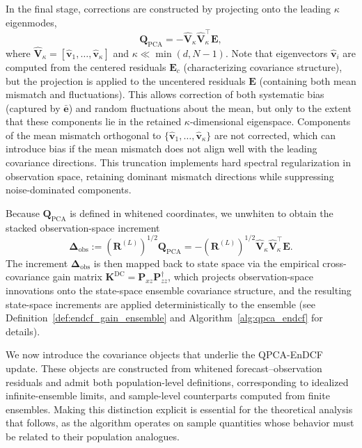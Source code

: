 \documentclass[11pt,a4paper]{article}
\begin{document}
In the final stage, corrections are constructed by projecting onto the leading $\kappa$ eigenmodes,
\begin{equation}
\mathbf{Q}_{\mathrm{PCA}}
=
-\hat{\mathbf{V}}_\kappa\hat{\mathbf{V}}_\kappa^\top\mathbf{E},
\label{eq:qpca_correction}
\end{equation}
where $\hat{\mathbf{V}}_\kappa=[\hat{\mathbf{v}}_1,\ldots,\hat{\mathbf{v}}_\kappa]$ and $\kappa\ll\min(d,N-1)$. Note that eigenvectors $\hat{\mathbf{v}}_i$ are computed from the centered residuals $\mathbf{E}_c$ (characterizing covariance structure), but the projection is applied to the uncentered residuals $\mathbf{E}$ (containing both mean mismatch and fluctuations). This allows correction of both systematic bias (captured by $\bar{\mathbf{e}}$) and random fluctuations about the mean, but only to the extent that these components lie in the retained $\kappa$-dimensional eigenspace. Components of the mean mismatch orthogonal to $\{\hat{\mathbf{v}}_1,\ldots,\hat{\mathbf{v}}_\kappa\}$ are not corrected, which can introduce bias if the mean mismatch does not align well with the leading covariance directions. This truncation implements hard spectral regularization in observation space, retaining dominant mismatch directions while suppressing noise-dominated components.

Because $\mathbf{Q}_{\mathrm{PCA}}$ is defined in whitened coordinates, we unwhiten to obtain the stacked observation-space increment
\begin{equation}
\boldsymbol{\Delta}_{\mathrm{obs}}
:=
(\mathbf{R}^{(L)})^{1/2}\mathbf{Q}_{\mathrm{PCA}}
=
-(\mathbf{R}^{(L)})^{1/2}\hat{\mathbf{V}}_\kappa\hat{\mathbf{V}}_\kappa^\top\mathbf{E}.
\label{eq:qpca_delta_obs}
\end{equation}
The increment $\boldsymbol{\Delta}_{\mathrm{obs}}$ is then mapped back to state space via the empirical cross-covariance gain matrix $\mathbf{K}^{\mathrm{DC}}=\mathbf{P}_{xz}\mathbf{P}_{zz}^{\dagger}$, which projects observation-space innovations onto the state-space ensemble covariance structure, and the resulting state-space increments are applied deterministically to the ensemble (see Definition~\ref{def:endcf_gain_ensemble} and Algorithm~\ref{alg:qpca_endcf} for details).

We now introduce the covariance objects that underlie the QPCA-EnDCF update. These objects are constructed from whitened forecast--observation residuals and admit both population-level definitions, corresponding to idealized infinite-ensemble limits, and sample-level counterparts computed from finite ensembles. Making this distinction explicit is essential for the theoretical analysis that follows, as the algorithm operates on sample quantities whose behavior must be related to their population analogues.
\end{document}
